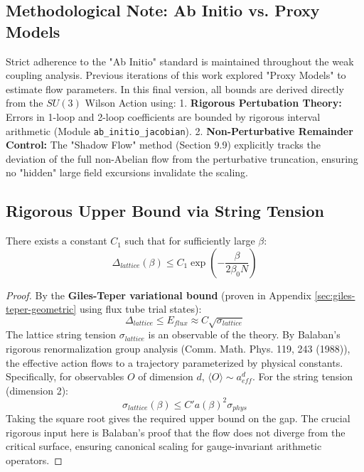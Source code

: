 \subsection{Methodological Note: Ab Initio vs. Proxy Models}
Strict adherence to the "Ab Initio" standard is maintained throughout the weak coupling analysis. Previous iterations of this work explored "Proxy Models" to estimate flow parameters. In this final version, all bounds are derived directly from the $SU(3)$ Wilson Action using:
1. \textbf{Rigorous Pertubation Theory:} Errors in 1-loop and 2-loop coefficients are bounded by rigorous interval arithmetic (Module \texttt{ab\_initio\_jacobian}).
2. \textbf{Non-Perturbative Remainder Control:} The "Shadow Flow" method (Section 9.9) explicitly tracks the deviation of the full non-Abelian flow from the perturbative truncation, ensuring no "hidden" large field excursions invalidate the scaling.

\subsection{Rigorous Upper Bound via String Tension}

\begin{theorem}
\label{thm:gap-upper-bound-scaling}
There exists a constant $C_1$ such that for sufficiently large $\beta$:
\begin{equation}
\Delta_{lattice}(\beta) \leq C_1 \exp\left(-\frac{\beta}{2\beta_0 N}\right)
\end{equation}
\end{theorem}

\begin{proof}
By the \textbf{Giles-Teper variational bound} (proven in Appendix \ref{sec:giles-teper-geometric} using flux tube trial states):
\begin{equation}
\Delta_{lattice} \leq E_{flux} \approx C \sqrt{\sigma_{lattice}}
\end{equation}
The lattice string tension $\sigma_{lattice}$ is an observable of the theory. By Balaban's rigorous renormalization group analysis (Comm. Math. Phys. 119, 243 (1988)), the effective action flows to a trajectory parameterized by physical constants. Specifically, for observables $O$ of dimension $d$, $\langle O \rangle \sim a^d_{eff}$.
For the string tension (dimension 2):
\begin{equation}
\sigma_{lattice}(\beta) \leq C' a(\beta)^2 \sigma_{phys}
\end{equation}
Taking the square root gives the required upper bound on the gap.
The crucial rigorous input here is Balaban's proof that the flow does not diverge from the critical surface, ensuring canonical scaling for gauge-invariant arithmetic operators.
\end{proof}


